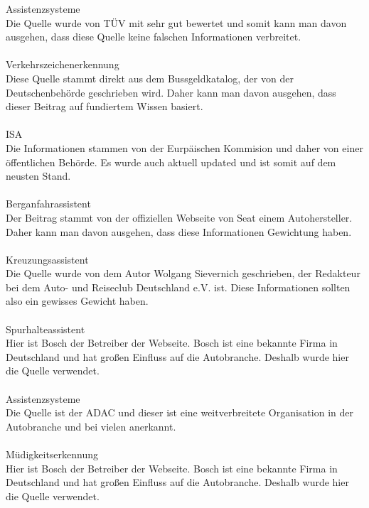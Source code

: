 Assistenzsysteme \cite{assistenzsysteme.PB1}\\
Die Quelle wurde von TÜV mit sehr gut bewertet und somit kann man davon ausgehen, dass diese Quelle keine falschen Informationen verbreitet.\\\\

Verkehrszeichenerkennung \cite{verkehrszeichenerk.PB1}\\
Diese Quelle stammt direkt aus dem Bussgeldkatalog, der von der Deutschenbehörde geschrieben wird. Daher kann man davon ausgehen, 
dass dieser Beitrag auf fundiertem Wissen basiert.\\\\

ISA \cite{ISA.PB1}\\
Die Informationen stammen von der Eurpäischen Kommision und daher von einer öffentlichen Behörde. Es wurde auch aktuell updated und 
ist somit auf dem neusten Stand.\\\\

Berganfahrassistent \cite{berganfahr.PB2}\\
Der Beitrag stammt von der offiziellen Webseite von Seat einem Autohersteller. Daher kann man davon ausgehen, dass diese Informationen
Gewichtung haben.\\\\

Kreuzungsassistent \cite{kreuzungsassi.PB1}\\
Die Quelle wurde von dem Autor Wolgang Sievernich geschrieben, der Redakteur bei dem Auto- und Reiseclub Deutschland e.V. ist. Diese Informationen sollten 
also ein gewisses Gewicht haben.\\\\

Spurhalteassistent \cite{spurhalte.PB2}\\
Hier ist Bosch der Betreiber der Webseite. Bosch ist eine bekannte Firma in Deutschland und hat großen Einfluss auf die Autobranche. Deshalb wurde hier die Quelle verwendet.\\\\

Assistenzsysteme \cite{assistenzsysteme.PB2}\\
Die Quelle ist der ADAC und dieser ist eine weitverbreitete Organisation in der Autobranche und bei vielen anerkannt.\\\\

Müdigkeitserkennung \cite{muedigkeitsassi.PB2}\\
Hier ist Bosch der Betreiber der Webseite. Bosch ist eine bekannte Firma in Deutschland und hat großen Einfluss auf die Autobranche. Deshalb wurde hier die Quelle verwendet.\\\\

